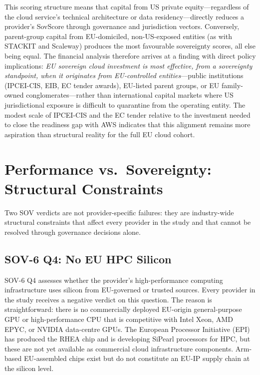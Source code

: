 This scoring structure means that capital from US private equity---regardless of the cloud service's technical architecture or data residency---directly reduces a provider's SovScore through governance and jurisdiction vectors. Conversely, parent-group capital from EU-domiciled, non-US-exposed entities (as with STACKIT and Scaleway) produces the most favourable sovereignty scores, all else being equal. The financial analysis therefore arrives at a finding with direct policy implications: \emph{EU sovereign cloud investment is most effective, from a sovereignty standpoint, when it originates from EU-controlled entities}---public institutions (IPCEI-CIS, EIB, EC tender awards), EU-listed parent groups, or EU family-owned conglomerates---rather than international capital markets where US jurisdictional exposure is difficult to quarantine from the operating entity. The modest scale of IPCEI-CIS and the EC tender relative to the investment needed to close the readiness gap with AWS indicates that this alignment remains more aspiration than structural reality for the full EU cloud cohort.

\section{Performance vs.\ Sovereignty: Structural Constraints}
\label{sec:structural_constraints}

Two SOV verdicts are not provider-specific failures: they are industry-wide structural constraints that affect every provider in the study and that cannot be resolved through governance decisions alone.

\subsection{SOV-6 Q4: No EU HPC Silicon}

SOV-6 Q4 assesses whether the provider's high-performance computing infrastructure uses silicon from EU-governed or trusted sources. Every provider in the study receives a negative verdict on this question. The reason is straightforward: there is no commercially deployed EU-origin general-purpose GPU or high-performance CPU that is competitive with Intel Xeon, AMD EPYC, or NVIDIA data-centre GPUs. The European Processor Initiative (EPI) has produced the RHEA chip and is developing SiPearl processors for HPC, but these are not yet available as commercial cloud infrastructure components. Arm-based EU-assembled chips exist but do not constitute an EU-IP supply chain at the silicon level.

